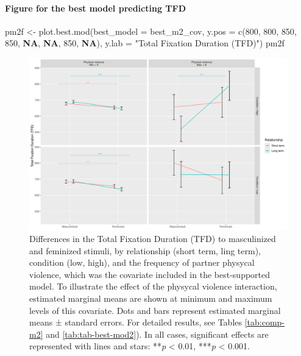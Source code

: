 \documentclass[
  bookmarksnumbered]{article}
\newenvironment{Shaded}{\begin{snugshade}}{\end{snugshade}}
\newcommand{\AttributeTok}[1]{\textcolor[rgb]{0.80,0.80,0.80}{#1}}
\newcommand{\ConstantTok}[1]{\textcolor[rgb]{0.86,0.64,0.64}{\textbf{#1}}}
\newcommand{\DecValTok}[1]{\textcolor[rgb]{0.86,0.86,0.80}{#1}}
\newcommand{\FunctionTok}[1]{\textcolor[rgb]{0.94,0.94,0.56}{#1}}
\newcommand{\NormalTok}[1]{\textcolor[rgb]{0.80,0.80,0.80}{#1}}
\newcommand{\OtherTok}[1]{\textcolor[rgb]{0.94,0.94,0.56}{#1}}
\newcommand{\StringTok}[1]{\textcolor[rgb]{0.80,0.58,0.58}{#1}}
\begin{document}
\paragraph{Figure for the best model predicting TFD}\label{figure-for-the-best-model-predicting-tfd}

\begin{Shaded}
\begin{Highlighting}[]
\NormalTok{pm2f }\OtherTok{\textless{}{-}} \FunctionTok{plot.best.mod}\NormalTok{(}\AttributeTok{best\_model =}\NormalTok{ best\_m2\_cov, }
                      \AttributeTok{y.pos =} \FunctionTok{c}\NormalTok{(}\DecValTok{800}\NormalTok{, }\DecValTok{800}\NormalTok{, }\DecValTok{850}\NormalTok{, }\DecValTok{850}\NormalTok{, }\ConstantTok{NA}\NormalTok{, }\ConstantTok{NA}\NormalTok{, }\DecValTok{850}\NormalTok{, }\ConstantTok{NA}\NormalTok{),}
                      \AttributeTok{y.lab =} \StringTok{"Total Fixation Duration (TFD)"}\NormalTok{)}
\NormalTok{pm2f}
\end{Highlighting}
\end{Shaded}

\begin{figure}
\centering
\includegraphics{Supplementary_material_files/figure-latex/fig-mod2-cov-1.pdf}
\caption{\label{fig:fig-mod2-cov}Differences in the Total Fixation Duration (TFD) to masculinized and feminized stimuli, by relationship (short term, ling term), condition (low, high), and the frequency of partner physycal violence, which was the covariate included in the best-supported model. To illustrate the effect of the physycal violence interaction, estimated marginal means are shown at minimum and maximum levels of this covariate. Dots and bars represent estimated marginal means ± standard errors. For detailed results, see Tables \ref{tab:comp-m2} and \ref{tab:tab-best-mod2}). In all cases, significant effects are represented with lines and stars: **\emph{p} \textless{} 0.01, ***\emph{p} \textless{} 0.001.}
\end{figure}
\end{document}

